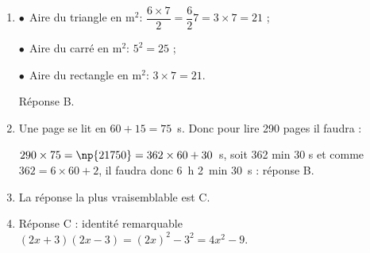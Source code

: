 \begin{enumerate}
\item $\bullet~~$Aire du triangle en m$^2$: $\dfrac{6 \times 7}{2} = \dfrac{6}{2}{7} = 3 \times 7 = 21$ ;

$\bullet~~$Aire du carré  en m$^2$: $5^2 = 25$ ;

$\bullet~~$Aire du rectangle  en m$^2$: $3 \times 7 = 21$.

Réponse B.
\item Une page se lit en $60 + 15 = 75$~s. Donc pour lire 290 pages il faudra :

$290 \times 75 = \np{21750} = 362 \times 60 + 30$~s, soit 362 min 30 s et comme $362  = 6 \times 60 + 2$,
il faudra donc 6~h 2~min 30~s : réponse B.
\item La réponse la plus vraisemblable est C.
\item Réponse C : identité remarquable $(2x +3)(2x - 3)= (2x)^2 - 3^2 = 4x^2 - 9$.
\end{enumerate}

\vspace{0,5cm}

